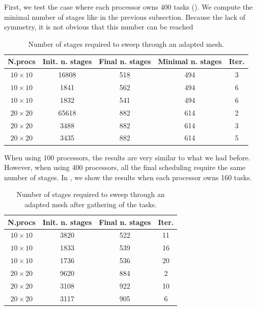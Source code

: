 \documentclass[letterpaper]{article}
\renewcommand{\(}{\left(}
\renewcommand{\)}{\right)}
\renewcommand{\[}{\left[}
\renewcommand{\]}{\right]}
\begin{document}
First, we test the case where each processor owns 400 tasks ().
We compute the minimal number of stages like in the previous subsection. Because
the lack of symmetry, it is not obvious that this number can be reached
\begin{table}[H]
  \begin{center}
    \begin{tabular}{|c|c|c|c|c|}
      \hline
      N.procs & Init. n. stages & Final n. stages & Minimal n. stages & Iter. \\
      \hline
      $10 \times 10$ & 16808 & 518 & 494 & 3 \\
      $10 \times 10$ &  1841 & 562 & 494 & 6 \\
      $10 \times 10$ &  1832 & 541 & 494 & 6 \\
      $20 \times 20$ & 65618 & 882 & 614 & 2 \\
      $20 \times 20$ &  3488 & 882 & 614 & 3 \\
      $20 \times 20$ &  3435 & 882 & 614 & 5 \\
      \hline
    \end{tabular}
    \caption{Number of stages required to sweep through an adapted mesh.}
    \label{band_1}
  \end{center}
\end{table}

When using 100 processors, the results are very similar to what we had before.
However, when using 400 processors, all the final scheduling 
require the same number of stages. In , we show the results when
each processor owns 160 tasks.

\begin{table}[H]
  \begin{center}
    \begin{tabular}{|c|c|c|c|}
      \hline
      N.procs & Init. n. stages & Final n. stages & Iter. \\
      \hline
      $10 \times 10$ & 3820 & 522 & 11 \\
      $10 \times 10$ & 1833 & 539 & 16 \\
      $10 \times 10$ & 1736 & 536 & 20 \\
      $20 \times 20$ & 9620 & 884 & 2  \\
      $20 \times 20$ & 3108 & 922 & 10 \\
      $20 \times 20$ & 3117 & 905 & 6  \\
      \hline
    \end{tabular}
    \caption{Number of stages required to sweep through an adapted mesh after
    gathering of the tasks.}
    \label{band_2}
  \end{center}
\end{table}
\end{document}
